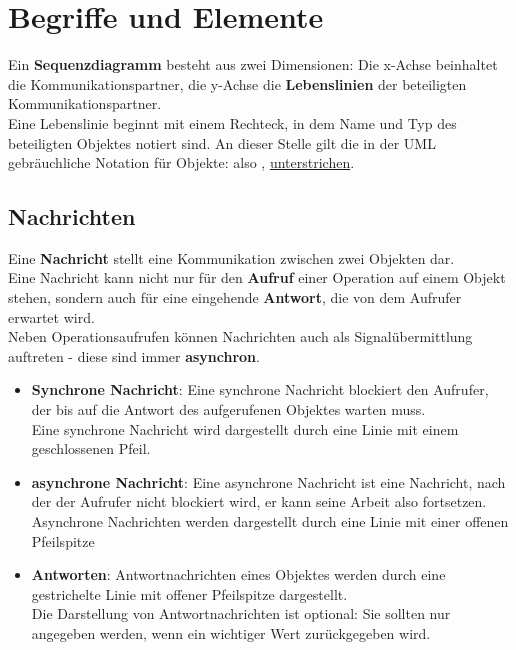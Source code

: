 \section{Begriffe und Elemente}

Ein \textbf{Sequenzdiagramm} besteht aus zwei Dimensionen: Die x-Achse beinhaltet die Kommunikationspartner, die y-Achse die \textbf{Lebenslinien} der beteiligten Kommunikationspartner.\\

\noindent
Eine Lebenslinie beginnt mit einem Rechteck, in dem Name und Typ des beteiligten Objektes notiert sind.
An dieser Stelle gilt die in der UML gebräuchliche Notation für Objekte: also , \underline{unterstrichen}.

\subsection{Nachrichten}
Eine \textbf{Nachricht} stellt eine Kommunikation zwischen zwei Objekten dar.\\
Eine Nachricht kann nicht nur für den \textbf{Aufruf} einer Operation auf einem Objekt stehen, sondern auch für eine eingehende \textbf{Antwort}, die von dem Aufrufer erwartet wird.\\
Neben Operationsaufrufen können Nachrichten auch als Signalübermittlung auftreten - diese sind immer \textbf{asynchron}.

\begin{itemize}
    \item \textbf{Synchrone Nachricht}: Eine synchrone Nachricht blockiert den Aufrufer, der bis auf die Antwort des aufgerufenen Objektes warten muss.\\
    Eine synchrone Nachricht wird dargestellt durch eine Linie mit einem geschlossenen Pfeil.
    \item \textbf{asynchrone Nachricht}: Eine asynchrone Nachricht ist eine Nachricht, nach der der Aufrufer nicht blockiert wird, er kann seine Arbeit also fortsetzen.\\
    Asynchrone Nachrichten werden dargestellt durch eine Linie mit einer offenen Pfeilspitze
    \item \textbf{Antworten}: Antwortnachrichten eines Objektes werden durch eine gestrichelte Linie mit offener Pfeilspitze dargestellt. \\
    Die Darstellung von Antwortnachrichten ist optional: Sie sollten nur angegeben werden, wenn ein wichtiger Wert zurückgegeben wird.
\end{itemize}


